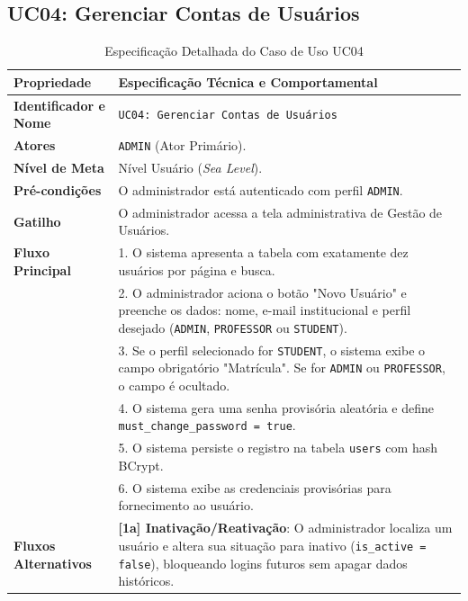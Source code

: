 \subsection{UC04: Gerenciar Contas de Usuários}
\label{uc04_especificacao}

\begin{table}[!ht]
\centering
\caption{Especificação Detalhada do Caso de Uso UC04}
\label{tab_uc04}
\footnotesize
\begin{tabularx}{\textwidth}{p{3.5cm} X}
\toprule
\textbf{Propriedade} & \textbf{Especificação Técnica e Comportamental} \\
\midrule
\textbf{Identificador e Nome} & \texttt{UC04: Gerenciar Contas de Usuários} \\
\textbf{Atores} & \texttt{ADMIN} (Ator Primário). \\
\textbf{Nível de Meta} & Nível Usuário (\textit{Sea Level}). \\
\textbf{Pré-condições} & O administrador está autenticado com perfil \texttt{ADMIN}. \\
\textbf{Gatilho} & O administrador acessa a tela administrativa de Gestão de Usuários. \\
\textbf{Fluxo Principal} & 
1. O sistema apresenta a tabela com exatamente dez usuários por página e busca.\\
& 2. O administrador aciona o botão "Novo Usuário" e preenche os dados: nome, e-mail institucional e perfil desejado (\texttt{ADMIN}, \texttt{PROFESSOR} ou \texttt{STUDENT}).\\
& 3. Se o perfil selecionado for \texttt{STUDENT}, o sistema exibe o campo obrigatório "Matrícula". Se for \texttt{ADMIN} ou \texttt{PROFESSOR}, o campo é ocultado.\\
& 4. O sistema gera uma senha provisória aleatória e define \texttt{must\_change\_password = true}.\\
& 5. O sistema persiste o registro na tabela \texttt{users} com hash BCrypt.\\
& 6. O sistema exibe as credenciais provisórias para fornecimento ao usuário. \\
\textbf{Fluxos Alternativos} & 
\textbf{[1a] Inativação/Reativação}: O administrador localiza um usuário e altera sua situação para inativo (\texttt{is\_active = false}), bloqueando logins futuros sem apagar dados históricos.\\

\end{tabularx}
\end{table}
